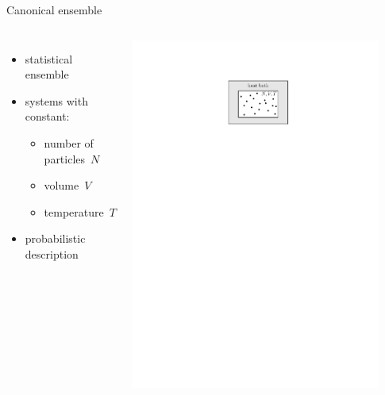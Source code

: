 \documentclass[mathserif,serif]{beamer}
\begin{document}
\begin{frame}{Canonical ensemble}
	\begin{columns}
			\begin{itemize}
				\setlength\itemsep{1.5em}
				\item statistical ensemble
				\item systems with constant:
				\begin{itemize}
					\item number of particles~$N$
					\item volume~$V$
					\item temperature~$T$
				\end{itemize}
				
				\item probabilistic description
			\end{itemize}
		
			
			\centering
			\includegraphics[width=0.9\textwidth]{./figures/canonical_ensemble.pdf}
		
	\end{columns}
\end{frame}
\end{document}
